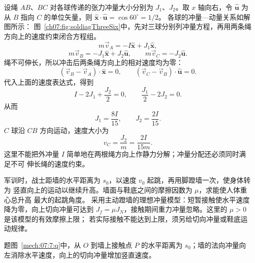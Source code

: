 {\begin{xesolution}
设绳 $AB$、$BC$ 对各球传递的张力冲量大小分别为 $J_1$、$J_2$。取 $x$ 轴向右，令
$\hat{\boldsymbol u}$ 为从 $B$ 指向 $C$ 的单位矢量，则
$\hat{\boldsymbol x}\mathbin{\cdot}\hat{\boldsymbol u}=\cos60^\circ=1/2$。
各球的冲量—动量关系如解图所示：
图~\ref{ch07:fig:soldiagThreeSix}中，先对三球分别列冲量方程，再用两条绳方向上的速度约束闭合方程组。
\soldiagThreeSix
\[
 m\vec v_A=-I\hat{\boldsymbol x}+J_1\hat{\boldsymbol x},
\]
\[
 m\vec v_B=-J_1\hat{\boldsymbol x}+J_2\hat{\boldsymbol u},
 \qquad
 m\vec v_C=-J_2\hat{\boldsymbol u}.
\]
绳不可伸长，所以冲击后两条绳方向上的相对速度均为零：
\[
 (\vec v_B-\vec v_A)\mathbin{\cdot}\hat{\boldsymbol x}=0,
 \qquad
 (\vec v_C-\vec v_B)\mathbin{\cdot}\hat{\boldsymbol u}=0.
\]
代入上面的速度表达式，得到
\[
 I-2J_1+\frac{J_2}{2}=0,
 \qquad
 \frac{J_1}{2}-2J_2=0.
\]
从而
\[
 J_1=\frac{8I}{15},
 \qquad
 J_2=\frac{2I}{15}.
\]
$C$ 球沿 $CB$ 方向运动，速度大小为
\[
 \boxed{v_C=\frac{J_2}{m}=\frac{2I}{15m}}.
\]
这里不能把外冲量 $I$ 简单地在两根绳方向上作静力分解；冲量分配还必须同时满足不可
伸长绳的速度约束。
\end{xesolution}

\begin{origexamplebox}{}\label{ch07:ex:s07-3-7}
军训时，战士距墙的水平距离为 $s_0$，以速度 $v_0$ 起跳，再用脚蹬墙一次，使身体转为
竖直向上的运动以继续升高。墙面与鞋底之间的摩擦因数为 $\mu$，求能使人体重心总升高
最大的起跳角度。
采用主动蹬墙的理想冲量模型：短暂接触使水平速度降为零，向上切向冲量可达到
$J_f=\mu J_N$，接触期间重力冲量忽略。这里的 $\mu>0$ 是该模型的有效摩擦上限；
若实际接触不能达到上限，须另给切向冲量或鞋底运动规律。

\begin{qualityfigure}
\label{mech:07:7:q}
\end{qualityfigure}
\end{origexamplebox}

\begin{xesolution}题图~\ref{mech:07:7:q}中，从 $O$ 到墙上接触点 $P$ 的水平距离为 $s_0$；墙的法向冲量向左消除水平速度，向上的切向冲量增加竖直速度。


\end{xesolution}}
